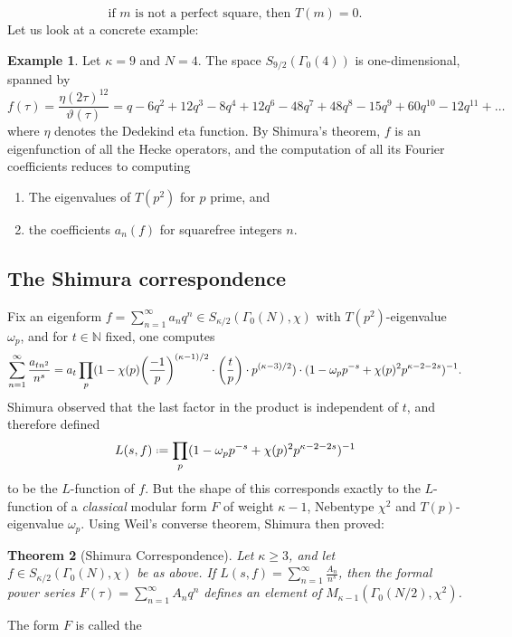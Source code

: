 \message{ !name(theta.tex)}\documentclass[11pt,a4paper,leqno]{article}
\newcommand{\1}{\mathbbm{1}}
\newcommand{\N}{\mathbb{N}}
\newcommand*{\defeq}{\mathrel{\vcenter{\baselineskip0.5ex \lineskiplimit0pt
      \hbox{\scriptsize.}\hbox{\scriptsize.}}}%
  =}
\renewcommand{\theta}{\vartheta}
\theoremstyle{plain}
\newtheorem{theorem}{Theorem}[section]
\theoremstyle{definition}
\newtheorem{example}[theorem]{Example}
\theoremstyle{remark}
\numberwithin{equation}{section}
\begin{document}
\[ \text{if $m$ is not a perfect square, then } T(m) = 0. 
\]
Let us look at a concrete example:
\begin{example}
  Let $\kappa = 9$ and $N=4$. The space $S_{9/2}(\Gamma_{0}(4))$ is
  one-dimensional, spanned by 
  \begin{equation}
    \label{eq:4}
f(\tau) = \frac{\eta(2\tau)^{12}}{\theta(\tau)} = q - 6q^2 + 12q^3 - 8q^4 + 12q^6 - 48q^7 + 48q^8 - 15q^9 + 60q^{10} - 12q^{11} + \ldots
  \end{equation}
  where $\eta$ denotes the Dedekind eta function. By Shimura's theorem,
  $f$ is an eigenfunction of all the Hecke operators, and the
  computation of all its Fourier coefficients reduces to computing
  \begin{enumerate}
  \item The eigenvalues of $T(p^{2})$ for $p$ prime, and 
  \item the coefficients $a_{n}(f)$ for squarefree integers $n$.
  \end{enumerate}
\end{example}

\subsection{The Shimura correspondence}
\label{sec:shim-corr}
Fix an eigenform $f = \sum_{n=1}^{\infty}a_{n}q^{n} \in S_{\kappa/2}(\Gamma_{0}(N),\chi)$
with $T(p^{2})$-eigenvalue $\omega_{p}$, and for $t \in \N$ fixed,
one computes
\begin{equation}
  \label{eq:5}
\sum_{n=1}^{\infty}\frac{a_{tn^{2}}}{n^{s}} = a_{t} \prod_{p}(1 -
\chi(p)\qty(\frac{-1}{p})^{(\kappa-1)/2}\cdot \qty(\frac{t}{p})\cdot p^{(\kappa-3)/2}) \cdot (1 -
\omega_{p}p^{-s} + \chi(p)^{2}p^{\kappa-2-2s})^{-1}.
\end{equation}
Shimura observed that the last factor in the product is
independent of $t$, and therefore defined
\begin{equation}
  \label{eq:5}
L(s,f) \defeq \prod_{p}(1 - \omega_{p}p^{-s} + \chi(p)^{2}p^{\kappa-2-2s})^{-1}
\end{equation}
to be the $L$-function of $f$. But the shape of this corresponds
exactly to the $L$-function of a \emph{classical} modular form $F$
of weight $\kappa-1$, Nebentype $\chi^{2}$ and $T(p)$-eigenvalue $\omega_{p}$.
Using Weil's converse theorem, Shimura then proved:

\begin{theorem}[Shimura Correspondence]
Let $\kappa \ge 3$, and let $f \in S_{\kappa/2}(\Gamma_{0}(N),\chi)$ be as above. If $L(s,f)
= \sum_{n=1}^{\infty}\frac{A_{n}}{n^{s}}$, then the formal power series $F(\tau)
= \sum_{n=1}^{\infty} A_{n}q^{n}$ defines an element of $M_{\kappa-1}(\Gamma_{0}(N/2),\chi^{2})$.
\end{theorem}
The form $F$ is called the 
\end{document}
